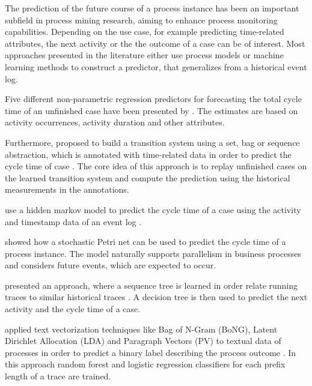 The prediction of the future course of a process instance has been an important subfield in process mining research, aiming to enhance process monitoring capabilities.
Depending on the use case, for example predicting time-related attributes, the next activity or the the outcome of a case can be of interest.
Most approaches presented in the literature either use process models or machine learning methods to construct a predictor, that generalizes from a historical event log.

Five different non-parametric regression predictors for forecasting the total cycle time of an unfinished case have been presented by  \cite{DBLP:conf/otm/DongenCA08}.
The estimates are based on activity occurrences, activity duration and other attributes.

Furthermore,  proposed to build a transition system using a set, bag or sequence abstraction, which is annotated with time-related data in order to predict the cycle time of case \cite{DBLP:journals/is/AalstSS11}.
The core idea of this approach is to replay unfinished cases on the learned transition system and compute the prediction using the historical measurements in the annotations.

\citeauthor{DBLP:conf/colcom/PandeyNC11} use a hidden markov model to predict the cycle time of a case using the activity and timestamp data of an event log \cite{DBLP:conf/colcom/PandeyNC11}.

\citeauthor{DBLP:conf/icsoc/Rogge-SoltiW13} showed how a stochastic Petri net can be used to predict the cycle time of a process instance.
The model naturally supports parallelism in business processes and considers future events, which are expected to occur. 

\citeauthor{DBLP:conf/dis/CeciLFCM14} presented an approach, where a sequence tree is learned in order relate running traces to similar historical traces \cite{DBLP:conf/dis/CeciLFCM14}.
A decision tree is then used to predict the next activity and the cycle time of a case.

\citeauthor{DBLP:conf/bpm/TeinemaaDMF16} applied text vectorization techniques like Bag of N-Gram (BoNG), Latent Dirichlet Allocation (LDA) and Paragraph Vectors (PV) to textual data of processes in order to predict a binary label describing the process outcome \cite{DBLP:conf/bpm/TeinemaaDMF16}.
In this approach random forest and logistic regression classifiers for each prefix length of a trace are trained.

